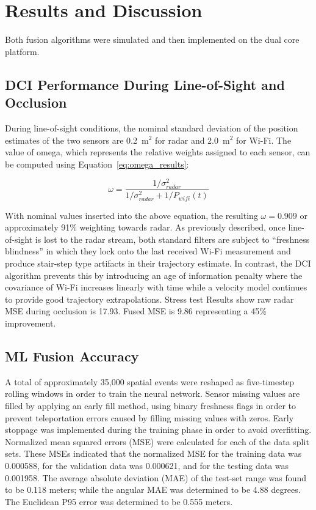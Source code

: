\chapter{Results and Discussion}
\label{chap:results}

Both fusion algorithms were simulated and then implemented on the dual core platform.

\section{DCI Performance During Line-of-Sight and Occlusion}
\label{sec:dci_results}

During line-of-sight conditions, the nominal standard deviation of the position estimates of the two sensors are 0.2~m$^2$ for radar and 2.0~m$^2$ for Wi-Fi. The value of omega, which represents the relative weights assigned to each sensor, can be computed using Equation~\ref{eq:omega_results}:

\begin{equation}
\omega = \frac{1/\sigma_{radar}^2}{1/\sigma_{radar}^2 + 1/P_{wifi}(t)}
\label{eq:omega_results}
\end{equation}

With nominal values inserted into the above equation, the resulting $\omega = 0.909$ or approximately 91\% weighting towards radar. As previously described, once line-of-sight is lost to the radar stream, both standard filters are subject to ``freshness blindness'' in which they lock onto the last received Wi-Fi measurement and produce stair-step type artifacts in their trajectory estimate. In contrast, the DCI algorithm prevents this by introducing an age of information penalty where the covariance of Wi-Fi increases linearly with time while a velocity model continues to provide good trajectory extrapolations. Stress test Results show raw radar MSE during occlusion is 17.93. Fused MSE is 9.86 representing a 45\% improvement.

\section{ML Fusion Accuracy}
\label{sec:ml_results}

A total of approximately 35,000 spatial events were reshaped as five-timestep rolling windows in order to train the neural network. Sensor missing values are filled by applying an early fill method, using binary freshness flags in order to prevent teleportation errors caused by filling missing values with zeros. Early stoppage was implemented during the training phase in order to avoid overfitting. Normalized mean squared errors (MSE) were calculated for each of the data split sets. These MSEs indicated that the normalized MSE for the training data was 0.000588, for the validation data was 0.000621, and for the testing data was 0.001958. The average absolute deviation (MAE) of the test-set range was found to be 0.118 meters; while the angular MAE was determined to be 4.88 degrees. The Euclidean P95 error was determined to be 0.555 meters.

